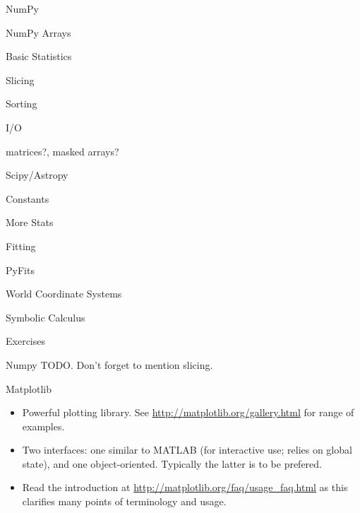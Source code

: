 \documentclass{beamer}
\begin{document}
\begin{frame}{NumPy}
  \begin{block}{NumPy Arrays}

  \end{block}
  \begin{block}{Basic Statistics}
  \end{block}
  \begin{block}{Slicing}

  \end{block}
  \begin{block}{Sorting}

  \end{block}    
  \begin{block}{I/O}

  \end{block}     
  matrices?, masked arrays?
\end{frame}

\begin{frame}{Scipy/Astropy}
  \begin{block}{Constants}

  \end{block}
  \begin{block}{More Stats}

  \end{block}
  \begin{block}{Fitting}

  \end{block}  
  \begin{block}{PyFits}

  \end{block}  
  \begin{block}{World Coordinate Systems}

  \end{block}
  \begin{block}{Symbolic Calculus}

  \end{block}
\end{frame}


\begin{frame}{Exercises}

\end{frame}

\begin{frame}{Numpy}
  TODO. Don't forget to mention slicing.
\end{frame}

\begin{frame}{Matplotlib}
  \begin{itemize}
    \item Powerful plotting library. See \url{http://matplotlib.org/gallery.html} for range of examples.
    \item Two interfaces: one similar to MATLAB (for interactive use; relies on global state), and one object-oriented. Typically the latter is to be prefered.
    \item Read the introduction at \url{http://matplotlib.org/faq/usage_faq.html} as this clarifies many points of terminology and usage.
  \end{itemize} 
\end{frame}
\end{document}
